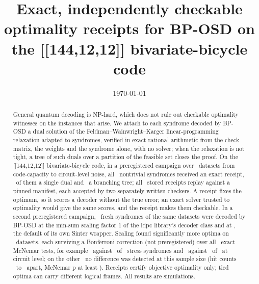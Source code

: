 \documentclass[aps,pra,twocolumn,superscriptaddress,nofootinbib,longbibliography,floatfix]{revtex4-2}
\begin{document}
\title{Exact, independently checkable optimality receipts for BP-OSD on the [[144,12,12]] bivariate-bicycle code}

\OwnerAuthor
\OwnerAffiliation

\date{\today}

\begin{abstract}
General quantum decoding is NP-hard, which does not rule out checkable optimality witnesses on the instances that arise. We attach to each syndrome decoded by BP-OSD a dual solution of the Feldman--Wainwright--Karger linear-programming relaxation adapted to syndromes, verified in exact rational arithmetic from the check matrix, the weights and the syndrome alone, with no solver; when the relaxation is not tight, a tree of such duals over a partition of the feasible set closes the proof. On the [[144,12,12]] bivariate-bicycle code, in a preregistered campaign over \HoRungs\ datasets from code-capacity to circuit-level noise, all \HoNontrivial\ nontrivial syndromes received an exact receipt, \RtHoSingleDual\ of them a single dual and \RtHoBranching\ a branching tree; all \ReplayReceipts\ stored receipts replay against a pinned manifest, each accepted by two separately written checkers. A receipt fixes the optimum, so it scores a decoder without the true error; an exact solver trusted to optimality would give the same scores, and the receipt makes them checkable. In a second preregistered campaign, \PrShots\ fresh syndromes of the same datasets were decoded by BP-OSD at the min-sum scaling factor 1 of the ldpc library's decoder class and at \ScaledAlpha, the default of its own Sinter wrapper. Scaling found significantly more optima on \PrSigMore\ datasets, each surviving a Bonferroni correction (not preregistered) over all \PrDatasets\ exact McNemar tests, for example \PrStressHitScaled\ against \PrStressHitUnscaled\ of \PrStressN\ stress syndromes and \PrCircuitHitScaled\ against \PrCircuitHitUnscaled\ of \PrCircuitN\ at circuit level; on the other \PrNoDiff\ no difference was detected at this sample size (hit counts \PrNoDiffGapMin\ to \PrNoDiffGapMax\ apart, McNemar p at least \PrNoDiffMinP). Receipts certify objective optimality only; tied optima can carry different logical frames. All results are simulations.
\end{abstract}

\maketitle

\end{document}

